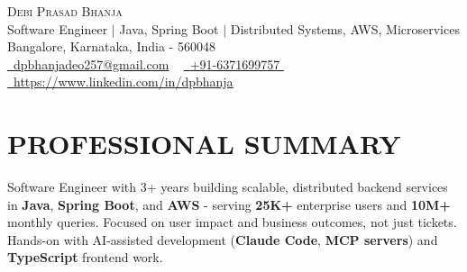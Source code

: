 \documentclass[letterpaper,11pt]{article}
\begin{document}


\begin{center}
    {\Huge \scshape Debi Prasad Bhanja} \\ \vspace{2pt}
    {\normalsize \color{emphasis} Software Engineer $|$ Java, Spring Boot $|$ Distributed Systems, AWS, Microservices} \\ \vspace{2pt}
    Bangalore, Karnataka, India - 560048 \\ \vspace{1pt}
    \small
     \href{mailto:dpbhanjadeo257@gmail.com}{\raisebox{-0.2\height}\faEnvelope\  \underline{dpbhanjadeo257@gmail.com}} ~
     \href{tel:+xxxxxxxxxxxx}{ \raisebox{-0.1\height}\faPhone\ \underline{+91-6371699757} } ~
     \href{https://www.linkedin.com/in/dpbhanja/}{\raisebox{-0.2\height}\faLinkedinSquare\ \underline{https://www.linkedin.com/in/dpbhanja}}
    \vspace{-8pt}
\end{center}

\section{PROFESSIONAL SUMMARY}
\vspace{1pt}
\small{Software Engineer with 3+ years building scalable, distributed backend services in \textbf{Java}, \textbf{Spring Boot}, and \textbf{AWS} - serving \textbf{25K+} enterprise users and \textbf{10M+} monthly queries. Focused on user impact and business outcomes, not just tickets. Hands-on with AI-assisted development (\textbf{Claude Code}, \textbf{MCP servers}) and \textbf{TypeScript} frontend work.}
\vspace{-12pt}

\end{document}
